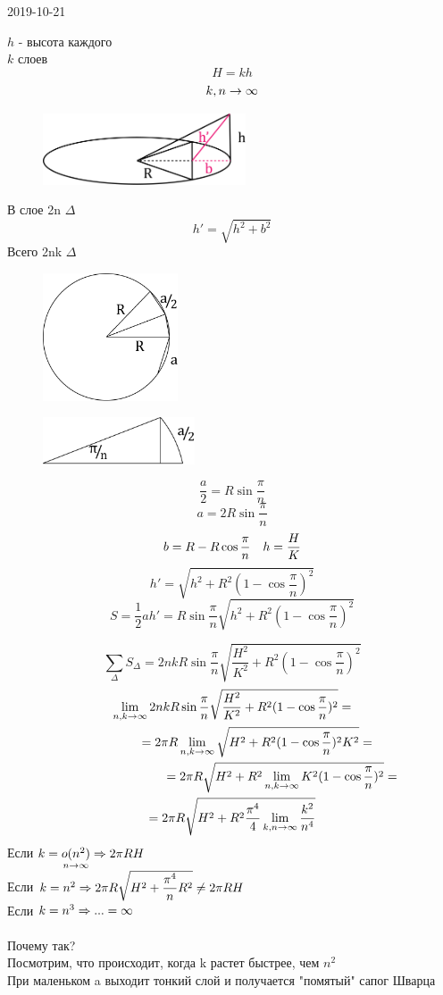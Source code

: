 \documentclass[main]{subfiles}
\begin{document}
\begin{lect} {2019-10-21}
\begin{example}[контрпример]
		$h$ - высота каждого\\
		$k$ слоев
		\[H = k h\]
		\[k,n \rightarrow \infty\]
		\begin{figure}[H]
			\centering
			\includegraphics[width=6cm]{pics/7_3.png}
		\end{figure}
		В слое 2n $\Delta$
		\[h'=\sqrt{h^2 + b^2}\]
		Всего 2nk $\Delta$
		\begin{figure}[H]
			\centering
			\includegraphics[width=4cm]{pics/7_4.png}
		\end{figure}
		\begin{figure}[H]
			\centering
			\includegraphics[width=4.5cm]{pics/7_5.png}
		\end{figure}
		\[\dfrac{a}{2} = R \sin \dfrac{\pi}{n}\]
		\[a = 2 R \sin \dfrac{\pi}{n}\]
		\[b = R - R \cos \dfrac{\pi}{n} \quad h = \dfrac{H}{K}\]
		\[h' = \sqrt{h^2 + R^2 (1-\cos \dfrac{\pi}{n})^2}\]
		\[S = \dfrac{1}{2} a h' = R \sin \dfrac{\pi}{n} \sqrt{h^2 + R^2 (1-\cos \dfrac{\pi}{n})^2}\]

		\[\sum_{\Delta} S_{\Delta} = 2nk R \sin \dfrac{\pi}{n} \sqrt{\dfrac{H^2}{K^2} + R^2 (1-\cos \dfrac{\pi}{n})^2}\]
		\begin{multline*}
			\lim_{n,k \rightarrow \infty} 2nk R \sin \dfrac{\pi}{n} \sqrt{\dfrac{H^2}{K^2} + R^2 (1-\cos \dfrac{\pi}{n})^2} = \\
			\qquad \qquad = 2 \pi R \lim_{n,k \rightarrow \infty} \sqrt{H^2 + R^2 (1-\cos \dfrac{\pi}{n})^2 K^2} = \\
			\qquad \qquad \qquad \qquad = 2 \pi R \sqrt{H^2 + R^2 \lim_{n,k \rightarrow \infty} K^2 (1-\cos \dfrac{\pi}{n})^2} = \\
			= 2\pi R \sqrt{H^2 + R^2 \dfrac{\pi^4}{4} \lim_{k,n \rightarrow \infty} \dfrac{k^2}{n^4}}
		\end{multline*}
		Если $k=\underset{n \rightarrow \infty}{o(n^2)} \Rightarrow 2\pi RH$\\
		Если $k = n^2 \Rightarrow 2 \pi R \sqrt{H^2 + \dfrac{\pi^4}{n} R^2} \neq 2\pi R H$\\
		Если $k = n^3 \Rightarrow ... = \infty$\\ \\
		Почему так? \\
		Посмотрим, что происходит, когда k растет быстрее, чем $n^2$\\
		При маленьком a выходит тонкий слой и получается "помятый"{} сапог Шварца
	\end{example}


\end{lect}
\end{document}
